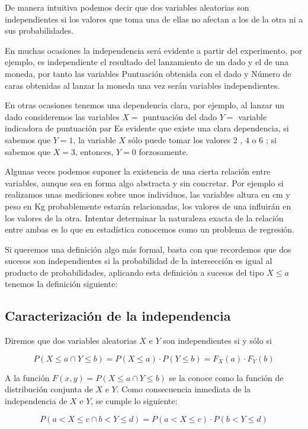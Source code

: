 \documentclass[
  a4paper,
  DIV=11,
  numbers=noendperiod]{scrreprt}
\begin{document}
De manera intuitiva podemos decir que dos variables aleatorias son
independientes si los valores que toma una de ellas no afectan a los de
la otra ni a sus probabilidades.

En muchas ocasiones la independencia será evidente a partir del
experimento, por ejemplo, es independiente el resultado del lanzamiento
de un dado y el de una moneda, por tanto las variables Puntuación
obtenida con el dado y Número de caras obtenidas al lanzar la moneda una
vez serán variables independientes.

En otras ocasiones tenemos una dependencia clara, por ejemplo, al lanzar
un dado consideremos las variables \(X=\) puntuación del dado \(Y=\)
variable indicadora de puntuación par Es evidente que existe una clara
dependencia, si sabemos que \(Y=1\), la variable \(X\) sólo puede tomar
los valores 2 , 4 o 6 ; si sabemos que \(X=3\), entonces, \(Y=0\)
forzosamente.

Algunas veces podemos suponer la existencia de una cierta relación entre
variables, aunque sea en forma algo abstracta y sin concretar. Por
ejemplo si realizamos unas mediciones sobre unos individuos, las
variables altura en cm y peso en Kg probablemente estarán relacionadas,
los valores de una influirán en los valores de la otra. Intentar
determinar la naturaleza exacta de la relación entre ambas es lo que en
estadística conocemos como un problema de regresión.

Si queremos una definición algo más formal, basta con que recordemos que
dos sucesos son independientes si la probabilidad de la intersección es
igual al producto de probabilidades, aplicando esta definición a sucesos
del tipo \(X \leq a\) tenemos la definición siguiente:

\subsection{Caracterización de la
independencia}\label{caracterizaciuxf3n-de-la-independencia}

Diremos que dos variables aleatorias \(X\) e \(Y\) son independientes si
y sólo si

\[
P(X \leq a \cap Y \leq b)=P(X \leq a) \cdot P(Y \leq b)=F_{X}(a) \cdot F_{Y}(b)
\]

A la función \(F(x, y)=P(X \leq a \cap Y \leq b)\) se la conoce como la
función de distribución conjunta de \(X\) e \(Y\). Como consecuencia
inmediata de la independencia de \(X\) e \(Y\), se cumple lo siguiente:

\[
P(a<X \leq c \cap b<Y \leq d)=P(a<X \leq c) \cdot P(b<Y \leq d)
\]
\end{document}
